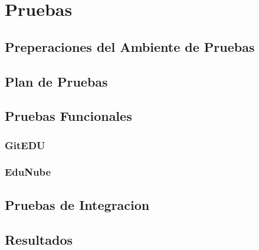 
\chapter{Pruebas}
\label{capitulo5}

\section{Preperaciones del Ambiente de Pruebas}

\section{Plan de Pruebas}

\section{Pruebas Funcionales}

\subsection{GitEDU}

\subsection{EduNube}

\section{Pruebas de Integracion}

\section{Resultados}

